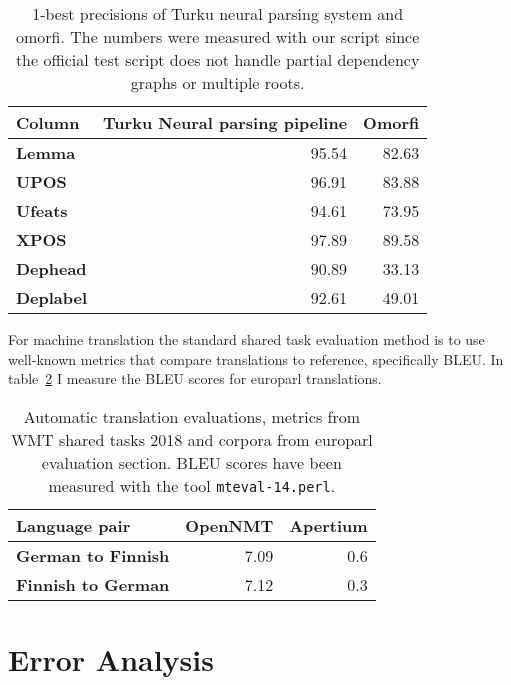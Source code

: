 \documentclass{flammie}
\begin{document}
\begin{table}
\begin{centering}
    \begin{tabular}{lrr}
        \toprule
    Column & \bf Turku Neural parsing pipeline & \bf Omorfi \\
        \midrule
        \bf Lemma & 95.54 & 82.63 \\
        \bf UPOS & 96.91 & 83.88 \\
        \bf Ufeats & 94.61 & 73.95\\
        \bf XPOS & 97.89 & 89.58 \\
        \bf Dephead & 90.89 & 33.13 \\
        \bf Deplabel & 92.61 & 49.01 \\
        \bottomrule
    \end{tabular}
    \caption{1-best precisions of Turku neural parsing system and
    omorfi. The numbers were measured with our script since the official
    test script does not handle partial dependency graphs or multiple roots.
\label{table:eval-ud}}
\end{centering}
\end{table}

For machine translation the standard shared task evaluation method is to
use well-known metrics that compare translations to reference, specifically
BLEU\@. In table~\ref{table:eval-wmt} I measure the BLEU scores for europarl
translations.

\begin{table}
\begin{centering}
    \begin{tabular}{lrr}
        \toprule
    Language pair & \bf OpenNMT & \bf Apertium \\
        \midrule
        \bf German to Finnish & 7.09 & 0.6 \\
        \bf Finnish to German & 7.12 & 0.3  \\
        \bottomrule
    \end{tabular}
    \caption{Automatic translation evaluations, metrics from WMT shared
    tasks 2018 and corpora from europarl evaluation section. BLEU scores have
    been measured with the tool \texttt{mteval-14.perl}.
\label{table:eval-wmt}}
\end{centering}
\end{table}


\section{Error Analysis}
\label{sec:errors}
\end{document}
